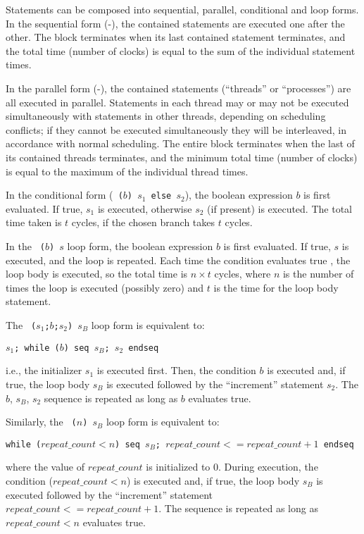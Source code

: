 Statements can be composed into sequential, parallel, conditional and
loop forms.  In the sequential form (-), the
contained statements are executed one after the other. The
 block terminates when its last contained statement
terminates, and the total time (number of clocks) is equal to the sum
of the individual statement times.

In the parallel form (-), the contained
statements (``threads'' or ``processes'') are all executed in
parallel.  Statements in each thread may or may not be executed
simultaneously with statements in other threads, depending on
scheduling conflicts; if they cannot be executed simultaneously they
will be interleaved, in accordance with normal scheduling.  The entire
{} block terminates when the last of its contained threads
terminates, and the minimum total time (number of clocks) is equal to
the maximum of the individual thread times.

In the conditional form (\texttt{ ($b$) $s_1$ else $s_2$}), the
boolean expression $b$ is first evaluated.  If true, $s_1$ is
executed, otherwise $s_2$ (if present) is executed.  The total time
taken is $t$ cycles, if the chosen branch takes $t$ cycles.

In the \texttt{ ($b$) $s$} loop form, the boolean
expression $b$ is first evaluated.  If true, $s$ is executed, and the
loop is repeated.  Each time the condition evaluates true , the loop
body is executed, so the total time is $n \times t$ cycles, where $n$
is the number of times the loop is executed (possibly zero) and $t$ is
the time for the loop body statement.

The \texttt{ ($s_1$;$b$;$s_2$) $s_B$} loop form is equivalent
to:
\begin{tabbing}
\hm \texttt{$s_1$; while ($b$) seq $s_B$; $s_2$ endseq}
\end{tabbing}
i.e., the initializer $s_1$ is executed first.  Then, the condition
$b$ is executed and, if true, the loop body $s_B$ is executed followed
by the ``increment'' statement $s_2$.  The $b$, $s_B$, $s_2$ sequence
is repeated as long as $b$ evaluates true.

Similarly, the \texttt{ ($n$) $s_B$} loop form is equivalent
to:
\begin{tabbing}
\hm \texttt{while ($repeat\_count < n$) seq $s_B$; $repeat\_count <= repeat\_count + 1$ endseq}
\end{tabbing}
where the value of $repeat\_count$ is initialized to $0$.  During
execution, the condition ($repeat\_count < n$) is executed and, if true, the loop body
$s_B$ is executed followed by the ``increment'' statement $repeat\_count <= repeat\_count + 1$.
The sequence is repeated as long as $repeat\_count < n$ evaluates true.

